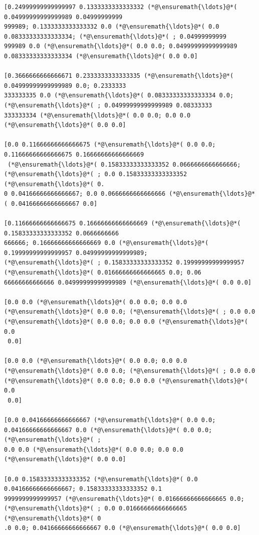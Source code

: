 \documentclass[12pt,a4paper]{article}
\begin{document}
\begin{lstlisting}
[0.24999999999999997 0.1333333333333332 (*@\ensuremath{\ldots}@*( 0.04999999999999989 0.04999999999
999989; 0.1333333333333332 0.0 (*@\ensuremath{\ldots}@*( 0.0 0.08333333333333334; (*@\ensuremath{\ldots}@*( ; 0.04999999999
999989 0.0 (*@\ensuremath{\ldots}@*( 0.0 0.0; 0.04999999999999989 0.08333333333333334 (*@\ensuremath{\ldots}@*( 0.0 0.0]

[0.3666666666666671 0.2333333333333335 (*@\ensuremath{\ldots}@*( 0.04999999999999989 0.0; 0.2333333
333333335 0.0 (*@\ensuremath{\ldots}@*( 0.08333333333333334 0.0; (*@\ensuremath{\ldots}@*( ; 0.04999999999999989 0.08333333
333333334 (*@\ensuremath{\ldots}@*( 0.0 0.0; 0.0 0.0 (*@\ensuremath{\ldots}@*( 0.0 0.0]

[0.0 0.11666666666666675 (*@\ensuremath{\ldots}@*( 0.0 0.0; 0.11666666666666675 0.16666666666666669
 (*@\ensuremath{\ldots}@*( 0.15833333333333352 0.0666666666666666; (*@\ensuremath{\ldots}@*( ; 0.0 0.15833333333333352 (*@\ensuremath{\ldots}@*( 0.
0 0.04166666666666667; 0.0 0.0666666666666666 (*@\ensuremath{\ldots}@*( 0.04166666666666667 0.0]

[0.11666666666666675 0.16666666666666669 (*@\ensuremath{\ldots}@*( 0.15833333333333352 0.0666666666
666666; 0.16666666666666669 0.0 (*@\ensuremath{\ldots}@*( 0.19999999999999957 0.04999999999999989; 
(*@\ensuremath{\ldots}@*( ; 0.15833333333333352 0.19999999999999957 (*@\ensuremath{\ldots}@*( 0.01666666666666665 0.0; 0.06
66666666666666 0.04999999999999989 (*@\ensuremath{\ldots}@*( 0.0 0.0]

[0.0 0.0 (*@\ensuremath{\ldots}@*( 0.0 0.0; 0.0 0.0 (*@\ensuremath{\ldots}@*( 0.0 0.0; (*@\ensuremath{\ldots}@*( ; 0.0 0.0 (*@\ensuremath{\ldots}@*( 0.0 0.0; 0.0 0.0 (*@\ensuremath{\ldots}@*( 0.0
 0.0]

[0.0 0.0 (*@\ensuremath{\ldots}@*( 0.0 0.0; 0.0 0.0 (*@\ensuremath{\ldots}@*( 0.0 0.0; (*@\ensuremath{\ldots}@*( ; 0.0 0.0 (*@\ensuremath{\ldots}@*( 0.0 0.0; 0.0 0.0 (*@\ensuremath{\ldots}@*( 0.0
 0.0]

[0.0 0.04166666666666667 (*@\ensuremath{\ldots}@*( 0.0 0.0; 0.04166666666666667 0.0 (*@\ensuremath{\ldots}@*( 0.0 0.0; (*@\ensuremath{\ldots}@*( ; 
0.0 0.0 (*@\ensuremath{\ldots}@*( 0.0 0.0; 0.0 0.0 (*@\ensuremath{\ldots}@*( 0.0 0.0]

[0.0 0.15833333333333352 (*@\ensuremath{\ldots}@*( 0.0 0.04166666666666667; 0.15833333333333352 0.1
9999999999999957 (*@\ensuremath{\ldots}@*( 0.01666666666666665 0.0; (*@\ensuremath{\ldots}@*( ; 0.0 0.01666666666666665 (*@\ensuremath{\ldots}@*( 0
.0 0.0; 0.04166666666666667 0.0 (*@\ensuremath{\ldots}@*( 0.0 0.0]


\end{lstlisting}
\end{document}

